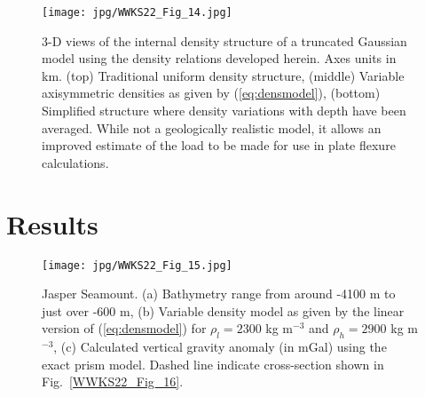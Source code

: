 \begin{figure}
\centering
\texttt{[image: jpg/WWKS22\_Fig\_14.jpg]}
\caption{3-D views of the internal density structure of a truncated Gaussian model using the density
relations developed herein. Axes units in km. (top) Traditional uniform density structure, (middle) Variable axisymmetric densities
as given by (\ref{eq:densmodel}), (bottom) Simplified structure where density variations with depth
have been averaged.  While not a geologically realistic model, it allows an improved estimate of the load
to be made for use in plate flexure calculations.}
\label{WWKS22_Fig_14}
\end{figure}

\section{Results}

\begin{figure}
\centering
\texttt{[image: jpg/WWKS22\_Fig\_15.jpg]}
\caption{Jasper Seamount. (a) Bathymetry range from around -4100 m to just over -600 m, (b) Variable density model
as given by the linear version of (\ref{eq:densmodel}) for $\rho_l = 2300$ kg m$^{-3}$ and $\rho_h = 2900$ kg m$^{-3}$,
(c) Calculated vertical gravity anomaly (in mGal) using the exact prism model.  Dashed line indicate cross-section
shown in Fig.~\ref{WWKS22_Fig_16}.}
\label{WWKS22_Fig_15}
\end{figure}

